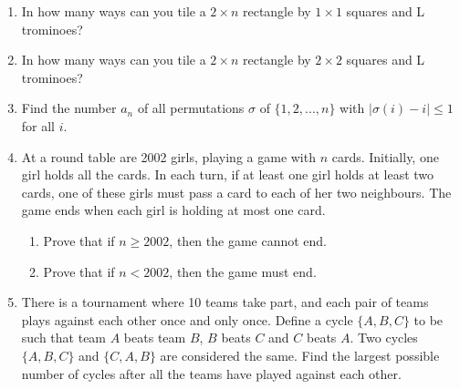 \documentclass[12pt]{article}
\begin{document}
\begin{enumerate}[resume]
    \item In how many ways can you tile a $2\times n$ rectangle by $1\times1$ squares and L trominoes?

    \item In how many ways can you tile a $2\times n$ rectangle by $2\times2$ squares and L trominoes?

    \item Find the number $a_{n}$ of all permutations $\sigma$ of $\{1,2,...,n\}$ with $|\sigma(i)-i|\le1$ for all $i$.

    \item At a round table are 2002 girls, playing a game with $n$ cards. Initially, one girl holds all the cards. In each turn, if at least one girl holds at least two cards, one of these girls must pass a card to each of her two neighbours. The game ends when each girl is holding at most one card.
    \begin{enumerate}
        \item[(a)] Prove that if $n\ge2002$, then the game cannot end.
        \item[(b)] Prove that if $n<2002$, then the game must end.
    \end{enumerate}

    \item There is a tournament where 10 teams take part, and each pair of teams plays against each other once and only once. Define a cycle $\{A, B, C\}$ to be such that team $A$ beats team $B$, $B$ beats $C$ and $C$ beats $A$. Two cycles $\{A, B, C\}$ and $\{C, A, B\}$ are considered the same. Find the largest possible number of cycles after all the teams have played against each other.
\end{enumerate}
\end{document}
